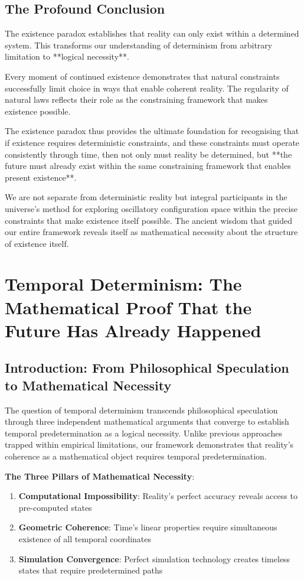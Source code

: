 \documentclass[11pt]{article}
\theoremstyle{remark}
\begin{document}
\subsection{The Profound Conclusion}

The existence paradox establishes that reality can only exist within a determined system. This transforms our understanding of determinism from arbitrary limitation to **logical necessity**.

Every moment of continued existence demonstrates that natural constraints successfully limit choice in ways that enable coherent reality. The regularity of natural laws reflects their role as the constraining framework that makes existence possible.

The existence paradox thus provides the ultimate foundation for recognising that if existence requires deterministic constraints, and these constraints must operate consistently through time, then not only must reality be determined, but **the future must already exist within the same constraining framework that enables present existence**.

We are not separate from deterministic reality but integral participants in the universe's method for exploring oscillatory configuration space within the precise constraints that make existence itself possible. The ancient wisdom that guided our entire framework reveals itself as mathematical necessity about the structure of existence itself.


\section{Temporal Determinism: The Mathematical Proof That the Future Has Already Happened}

\subsection{Introduction: From Philosophical Speculation to Mathematical Necessity}

The question of temporal determinism transcends philosophical speculation through three independent mathematical arguments that converge to establish temporal predetermination as a logical necessity. Unlike previous approaches trapped within empirical limitations, our framework demonstrates that reality's coherence as a mathematical object requires temporal predetermination.

\textbf{The Three Pillars of Mathematical Necessity}:
\begin{enumerate}
\item \textbf{Computational Impossibility}: Reality's perfect accuracy reveals access to pre-computed states
\item \textbf{Geometric Coherence}: Time's linear properties require simultaneous existence of all temporal coordinates
\item \textbf{Simulation Convergence}: Perfect simulation technology creates timeless states that require predetermined paths
\end{enumerate}
\end{document}
